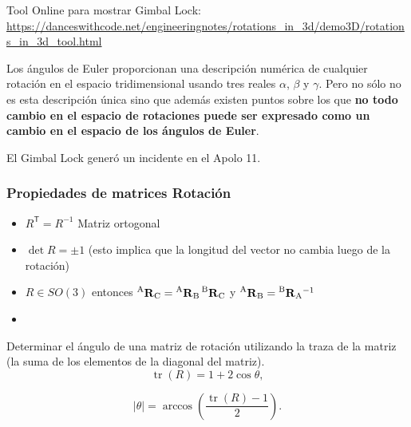 \begin{frame}
    Tool Online para mostrar Gimbal Lock: \url{https://danceswithcode.net/engineeringnotes/rotations_in_3d/demo3D/rotations_in_3d_tool.html}
    

      
    Los ángulos de Euler proporcionan una descripción numérica de cualquier rotación en el espacio tridimensional usando tres reales $\alpha$, $\beta$ y $\gamma$. Pero no sólo no es esta descripción única sino que además existen puntos sobre los que \textbf{no todo cambio en el espacio de rotaciones puede ser expresado como un cambio en el espacio de los ángulos de Euler}.
    
    El Gimbal Lock generó un incidente en el Apolo 11.
    

\end{frame}

\begin{frame}
    \frametitle{Propiedades de matrices Rotación}
    \small
    \begin{itemize}
        \item $R^{\mathsf {T}}=R^{-1}$ Matriz ortogonal
        \item $\det R = \pm 1$ (esto implica que la longitud del vector no cambia luego de la rotación)
        \item $R \in SO(3)$ entonces $\prescript{\mathrm{A}}{}{{\boldsymbol{\mathbf{R}}}_\mathrm{C}} = \prescript{\mathrm{A}}{}{{\boldsymbol{\mathbf{R}}}_\mathrm{B}} \prescript{\mathrm{B}}{}{{\boldsymbol{\mathbf{R}}}_\mathrm{C}}$ y $\prescript{\mathrm{A}}{}{{\boldsymbol{\mathbf{R}}}_\mathrm{B}} = \prescript{\mathrm{B}}{}{{\boldsymbol{\mathbf{R}}}_\mathrm{A}}^{-1}$
        \item {}
    \end{itemize}

    Determinar el ángulo de una matriz de rotación utilizando la traza de la matriz (la suma de los elementos de la diagonal del matriz).
    \begin{equation*}
        {\displaystyle \operatorname {tr} (R)=1+2\cos \theta ,}
    \end{equation*}

    \begin{equation*}
        {\displaystyle |\theta |=\arccos \left({\frac {\operatorname {tr} (R)-1}{2}}\right).}
    \end{equation*}

\end{frame}

